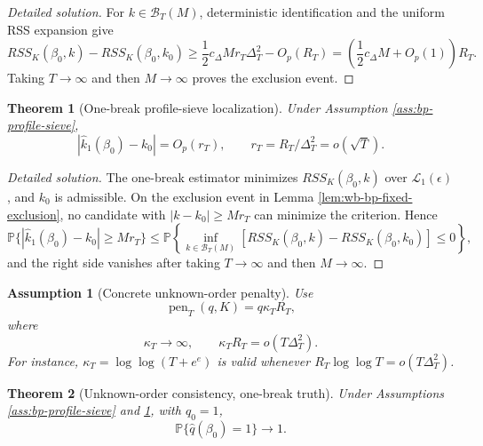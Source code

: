 \documentclass[12pt]{article}
\numberwithin{equation}{section}
\newtheorem{theorem}{Theorem}
\newtheorem{assumption}{Assumption}
\theoremstyle{definition}
\newcommand{\Pp}{\mathbb P}
\begin{document}
\begin{proof}[Detailed solution]
For \(k\in\mathcal B_T(M)\), deterministic identification and the uniform RSS
expansion give
\[
    RSS_K(\beta_0,k)-RSS_K(\beta_0,k_0)
    \geq \frac12 c_\Delta M r_T\Delta_T^2-O_p(R_T)
    =\left(\frac12c_\Delta M+O_p(1)\right)R_T.
\]
Taking \(T\to\infty\) and then \(M\to\infty\) proves the exclusion event.
\end{proof}

\begin{theorem}[One-break profile-sieve localization]
\label{thm:wb-localization}
Under Assumption \ref{ass:bp-profile-sieve},
\[
    |\widehat k_1(\beta_0)-k_0|=O_p(r_T),
    \qquad
    r_T=R_T/\Delta_T^2=o(\sqrt T).
\]
\end{theorem}

\begin{proof}[Detailed solution]
The one-break estimator minimizes \(RSS_K(\beta_0,k)\) over
\(\mathcal L_1(\epsilon)\), and \(k_0\) is admissible.  On the exclusion event
in Lemma \ref{lem:wb-bp-fixed-exclusion}, no candidate with
\(|k-k_0|\geq Mr_T\) can minimize the criterion.  Hence
\[
    \Pp\{|\widehat k_1(\beta_0)-k_0|\geq Mr_T\}
    \leq
    \Pp\left\{
      \inf_{k\in\mathcal B_T(M)}
      [RSS_K(\beta_0,k)-RSS_K(\beta_0,k_0)]\leq0
    \right\},
\]
and the right side vanishes after taking \(T\to\infty\) and then
\(M\to\infty\).
\end{proof}

\begin{assumption}[Concrete unknown-order penalty]
\label{ass:wb-penalty}
Use
\[
    \operatorname{pen}_T(q,K)=q\kappa_T R_T,
\]
where
\[
    \kappa_T\to\infty,
    \qquad
    \kappa_T R_T=o(T\Delta_T^2).
\]
For instance, \(\kappa_T=\log\log(T+e^e)\) is valid whenever
\(R_T\log\log T=o(T\Delta_T^2)\).
\end{assumption}

\begin{theorem}[Unknown-order consistency, one-break truth]
\label{thm:wb-order}
Under Assumptions \ref{ass:bp-profile-sieve} and \ref{ass:wb-penalty}, with
\(q_0=1\),
\[
    \Pp\{\widehat q(\beta_0)=1\}\to1.
\]
\end{theorem}
\end{document}

